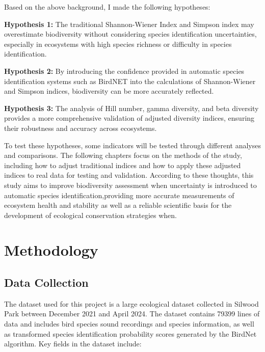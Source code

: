 \documentclass[a4paper,12pt]{article}
\begin{document}
Based on the above background, I made the following hypotheses:

\textbf{Hypothesis 1:} The traditional Shannon-Wiener Index and Simpson index may overestimate biodiversity without considering species identification uncertainties, especially in ecosystems with high species richness or difficulty in species identification.

\textbf{Hypothesis 2:} By introducing the confidence provided in automatic species identification systems such as BirdNET into the calculations of Shannon-Wiener and Simpson indices, biodiversity can be more accurately reflected.

\textbf{Hypothesis 3:} The analysis of Hill number, gamma diversity, and beta diversity provides a more comprehensive validation of adjusted diversity indices, ensuring their robustness and accuracy across ecosystems.

To test these hypotheses, some indicators will be tested through different analyses and comparisons. The following chapters focus on the methods of the study, including how to adjust traditional indices and how to apply these adjusted indices to real data for testing and validation. According to these thoughts, this study aims to improve biodiversity assessment when uncertainty is introduced to automatic species identification,providing more accurate measurements of ecosystem health and stability as well as a reliable scientific basis for the development of ecological conservation strategies when.


\section{Methodology}

\subsection{Data Collection}
The dataset used for this project is a large ecological dataset collected in Silwood Park between December 2021 and April 2024. The dataset contains 79399 lines of data and includes bird species sound recordings and species information, as well as transformed species identification probability scores generated by the BirdNet algorithm. Key fields in the dataset include:
\end{document}
